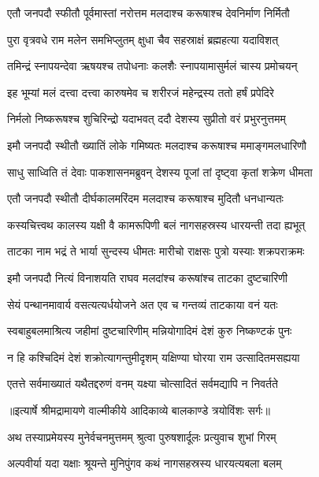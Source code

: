 \twolineshloka
{एतौ जनपदौ स्फीतौ पूर्वमास्तां नरोत्तम}
{मलदाश्च करूषाश्च देवनिर्माण निर्मितौ} %

\twolineshloka
{पुरा वृत्रवधे राम मलेन समभिप्लुतम्}
{क्षुधा चैव सहस्राक्षं ब्रह्महत्या यदाविशत्} %

\twolineshloka
{तमिन्द्रं स्नापयन्देवा ऋषयश्च तपोधनाः}
{कलशैः स्नापयामासुर्मलं चास्य प्रमोचयन्} %

\twolineshloka
{इह भूम्यां मलं दत्त्वा दत्त्वा कारुषमेव च}
{शरीरजं महेन्द्रस्य ततो हर्षं प्रपेदिरे} %

\twolineshloka
{निर्मलो निष्करूषश्च शुचिरिन्द्रो यदाभवत्}
{ददौ देशस्य सुप्रीतो वरं प्रभुरनुत्तमम्} %

\twolineshloka
{इमौ जनपदौ स्थीतौ ख्यातिं लोके गमिष्यतः}
{मलदाश्च करूषाश्च ममाङ्गमलधारिणौ} %

\twolineshloka
{साधु साध्विति तं देवाः पाकशासनमब्रुवन्}
{देशस्य पूजां तां दृष्ट्वा कृतां शक्रेण धीमता} %

\twolineshloka
{एतौ जनपदौ स्थीतौ दीर्घकालमरिंदम}
{मलदाश्च करूषाश्च मुदितौ धनधान्यतः} %

\twolineshloka
{कस्यचित्त्वथ कालस्य यक्षी वै कामरूपिणी}
{बलं नागसहस्रस्य धारयन्ती तदा ह्यभूत्} %

\twolineshloka
{ताटका नाम भद्रं ते भार्या सुन्दस्य धीमतः}
{मारीचो राक्षसः पुत्रो यस्याः शक्रपराक्रमः} %

\twolineshloka
{इमौ जनपदौ नित्यं विनाशयति राघव}
{मलदांश्च करूषांश्च ताटका दुष्टचारिणी} %

\twolineshloka
{सेयं पन्थानमावार्य वसत्यत्यर्धयोजने}
{अत एव च गन्तव्यं ताटकाया वनं यतः} %

\twolineshloka
{स्वबाहुबलमाश्रित्य जहीमां दुष्टचारिणीम्}
{मन्नियोगादिमं देशं कुरु निष्कण्टकं पुनः} %

\twolineshloka
{न हि कश्चिदिमं देशं शक्रोत्यागन्तुमीदृशम्}
{यक्षिण्या घोरया राम उत्सादितमसह्यया} %

\twolineshloka
{एतत्ते सर्वमाख्यातं यथैतद्दरुणं वनम्}
{यक्ष्या चोत्सादितं सर्वमद्यापि न निवर्तते} %


{॥इत्यार्षे श्रीमद्रामायणे वाल्मीकीये आदिकाव्ये बालकाण्डे त्रयोविंशः सर्गः॥}


\twolineshloka
{अथ तस्याप्रमेयस्य मुनेर्वचनमुत्तमम्}
{श्रुत्वा पुरुषशार्दूलः प्रत्युवाच शुभां गिरम्} %

\twolineshloka
{अल्पवीर्या यदा यक्षाः श्रूयन्ते मुनिपुंगव}
{कथं नागसहस्रस्य धारयत्यबला बलम्} %

